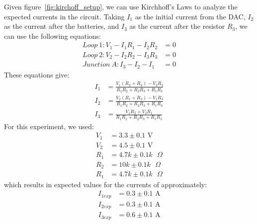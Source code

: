 \documentclass[11pt]{article}
\begin{document}
    Given figure~\ref{fig:kirchoff_setup}, we can use Kirchhoff's Laws to analyze the expected currents in the circuit.
    Taking $I_1$ as the initial current from the DAC, $I_2$ as the current after the batteries, and $I_3$ as the current after the resistor $R_3$, we can use the following equations:
    \begin{align*}
        Loop~1: V_1 - I_1 R_1 - I_2 R_2 &= 0 \\
        Loop~2: V_2 - I_2 R_2 - I_3 R_3 &= 0 \\
        Junction~A: I_3 - I_2 - I_1 &= 0
    \end{align*}
    These equations give:
    \begin{align*}
        I_1 &= \frac{V_1(R_2 + R_3) - V_2 R_3}{R_1 R_2 + R_2 R_3 + R_1 R_3} \\
        I_2 &= \frac{V_2(R_1 + R_3) - V_1 R_3}{R_1 R_2 + R_2 R_3 + R_1 R_3} \\
        I_3 &= \frac{V_1 R_2 + V_2 R_1}{R_1 R_2 + R_2 R_3 + R_1 R_3}
    \end{align*}
    For this experiment, we used:
    \begin{align*}
        V_1 &= 3.3 \pm 0.1 \text{ V} \\
        V_2 &= 4.5 \pm 0.1 \text{ V} \\
        R_1 &= 4.7k \pm 0.1k \text{ $\Omega$} \\
        R_2 &= 10k \pm 0.1k \text{ $\Omega$} \\
        R_1 &= 4.7k \pm 0.1k \text{ $\Omega$}
    \end{align*}
    which results in expected values for the currents of approximately:
    \begin{align*}
        I_{1exp} &= 0.3 \pm 0.1 \text{ A} \\
        I_{2exp} &= 0.3 \pm 0.1 \text{ A} \\
        I_{3exp} &= 0.6 \pm 0.1 \text{ A}
    \end{align*}
\end{document}

